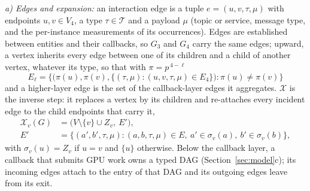 \emph{a) Edges and expansion:} an interaction edge is a tuple
$e=(u,v,\tau,\mu)$ with endpoints $u,v\in V_4$, a type
$\tau\in\mathcal{T}$ and a payload $\mu$ (topic or service, message
type, and the per-instance measurements of its occurrences). Edges are
established between entities and their callbacks, so $G_3$ and $G_4$
carry the same edges; upward, a vertex inherits every edge between one
of its children and a child of another vertex, whatever its type, so
that with $\pi=p^{\,4-\ell}$
\[
E_\ell=\bigl\{\bigl(\pi(u),\pi(v),\{(\tau,\mu):(u,v,\tau,\mu)\in E_4\}\bigr)
: \pi(u)\neq\pi(v)\bigr\}
\]
and a higher-layer edge is the set of the callback-layer edges it
aggregates. $\mathcal{X}$ is the inverse step: it replaces a vertex by
its children and re-attaches every incident edge to the child endpoints
that carry it,
\begin{align*}
\mathcal{X}_v(G) &= \bigl(V\setminus\{v\}\cup Z_v,\ E'\bigr),\\
E' &= \{(a',b',\tau,\mu):(a,b,\tau,\mu)\in E,\ a'\in\sigma_v(a),\ b'\in\sigma_v(b)\},
\end{align*}
with $\sigma_v(u)=Z_v$ if $u=v$ and $\{u\}$ otherwise. Below the
callback layer, a callback that submits GPU work owns a typed DAG
(Section~\ref{sec:model}c); its incoming edges attach to the entry of
that DAG and its outgoing edges leave from its exit.

